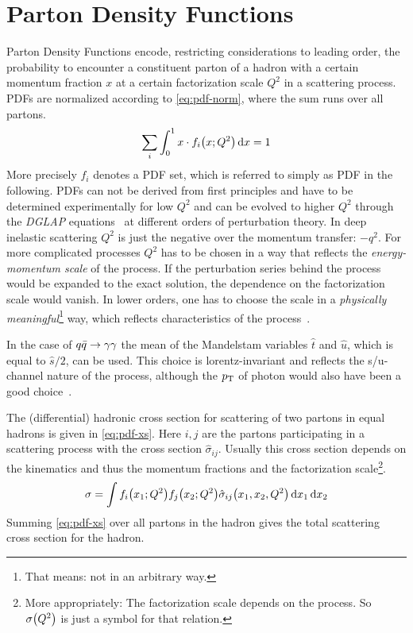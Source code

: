 \section{Parton Density Functions}%
\label{sec:pdf_basics}

Parton Density Functions encode, restricting considerations to leading
order, the probability to encounter a constituent parton of a hadron
with a certain momentum fraction \(x\) at a certain factorization
scale \(Q^2\) in a scattering process. PDFs are normalized according
to \cref{eq:pdf-norm}, where the sum runs over all partons.
%
\begin{equation}
  \label{eq:pdf-norm}
  \sum_i\int_0^1x\cdot f_i\qty(x;Q^2) \dd{x} = 1
\end{equation}
%
More precisely \({f_i}\) denotes a PDF set, which is referred to
simply as PDF in the following.  PDFs can not be derived from first
principles and have to be determined experimentally for low \(Q^2\)
and can be evolved to higher \(Q^2\) through the \emph{DGLAP}
equations~\cite{altarelli:1977af} at different orders of perturbation
theory.  In deep inelastic scattering \(Q^2\) is just the negative
over the momentum transfer: \(-q^2\). For more complicated processes
\(Q^2\) has to be chosen in a way that reflects the
\emph{energy-momentum scale} of the process. If the perturbation
series behind the process would be expanded to the exact solution, the
dependence on the factorization scale would vanish. In lower orders,
one has to choose the scale in a \emph{physically
  meaningful}\footnote{That means: not in an arbitrary way.} way,
which reflects characteristics of the process~\cite{altarelli:1977af}.

In the case of \(q\bar{q}\rightarrow\gamma\gamma\) the mean of the Mandelstam variables
\(\hat{t}\) and \(\hat{u}\), which is equal to \(\hat{s}/2\), can be
used. This choice is lorentz-invariant and reflects the s/u-channel
nature of the process, although the \(p_\mathrm{T}\) of photon would also have
been a good choice~\cite[18]{buckley:2011ge}.

The (differential) hadronic cross section for scattering of two
partons in equal hadrons is given in \cref{eq:pdf-xs}. Here \(i,j\)
are the partons participating in a scattering process with the cross
section \(\hat{\sigma}_{ij}\). Usually this cross section depends on
the kinematics and thus the momentum fractions and the factorization
scale\footnote{More appropriately: The factorization scale depends on
  the process. So \(\sigma\qty(Q^2)\) is just a symbol for that
  relation.}.
%
\begin{equation}
  \label{eq:pdf-xs}
  \sigma = \int f_i\qty(x_1;Q^2) f_j\qty(x_2;Q^2) \hat{\sigma}_{ij}\qty(x_1,
  x_2, Q^2)\dd{x_1}\dd{x_2}
\end{equation}
%
Summing \cref{eq:pdf-xs} over all partons in the hadron gives
the total scattering cross section for the hadron.

